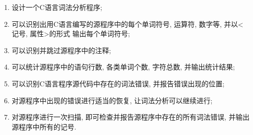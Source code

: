 \begin{enumerate}
  \item 设计一个C语言词法分析程序;
  \item 可以识别出用C语言编写的源程序中的每个单词符号, 运算符, 数字等,
  并以<记号, 属性>的形式 输出每个单词符号;
  \item 可以识别并跳过源程序中的注释;
  \item 可以统计源程序中的语句行数, 各类单词个数, 字符总数, 并输出统计结果;
  \item 可以识别C语言程序源代码中存在的词法错误, 并报告错误出现的位置;
  \item 对源程序中出现的错误进行适当的恢复, 让词法分析可以继续进行;
  \item 对源程序进行一次扫描, 即可检查并报告源程序中存在的所有词法错误, 并输出
  源程序中所有的记号.
\end{enumerate}
